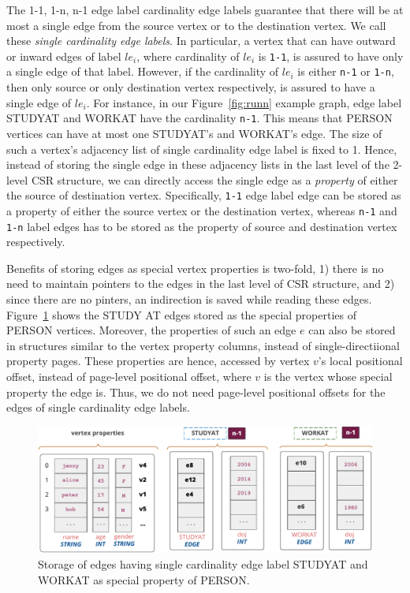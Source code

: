 The 1-1, 1-n, n-1 edge label cardinality edge labels guarantee that there will be at most a single edge from the source vertex or to the destination vertex. We call these \emph{single cardinality edge labels}. In particular, a vertex that can have outward or inward edges of label $le_i$, where cardinality of $le_i$ is \texttt{1-1}, is assured to have only a single edge of that label. However, if the cardinality of $le_i$ is either \texttt{n-1} or \texttt{1-n}, then only source or only destination vertex respectively, is assured to have a single edge of $le_i$. For instance, in our Figure~\ref{fig:runn} example graph, edge label STUDYAT and WORKAT have the cardinality \texttt{n-1}. This means that PERSON vertices can have at most one STUDYAT's and WORKAT's edge. The size of such a vertex's adjacency list of single cardinality edge label is fixed to 1. Hence, instead of storing the single edge in these adjacency lists in the last level of the 2-level CSR structure, we can directly access the single edge as a \emph{property} of either the source of destination vertex. Specifically, \texttt{1-1} edge label edge can be stored as a property of either the source vertex or the destination vertex, whereas \texttt{n-1} and \texttt{1-n} label edges has to be stored as the property of source and destination vertex respectively. 

Benefits of storing edges as special vertex properties is two-fold, 1) there is no need to maintain pointers to the edges in the last level of CSR structure, and 2) since there are no pinters, an indirection is saved while reading these edges. Figure~\ref{fig:single-cardinality-cols} shows the STUDY AT edges stored as the special properties of PERSON vertices. Moreover, the properties of such an edge $e$ can also be stored in structures similar to the vertex property columns, instead of single-directiional property pages. These properties are hence, accessed by vertex $v$'s local positional offset, instead of page-level positional offset, where $v$ is the vertex whose special property the edge is. Thus, we do not need page-level positional offsets for the edges of single cardinality edge labels.

\begin{figure}
	\hfill\includegraphics[scale=0.78]{img/single-cardinality-cols}\hspace*{\fill}
	\captionsetup{justification=centering}
	\caption{Storage of edges having single cardinality edge label STUDYAT and WORKAT as special property of PERSON.}
	\label{fig:single-cardinality-cols}
\end{figure}

